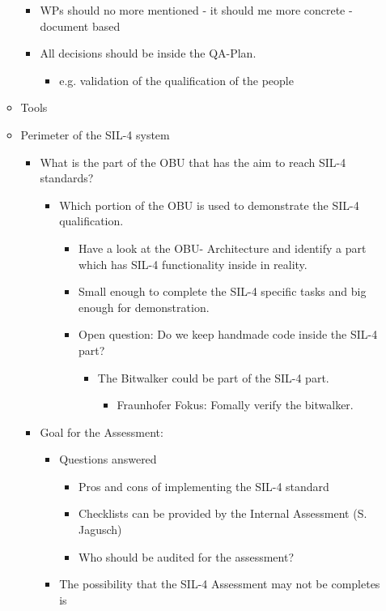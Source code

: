 \documentclass[a4paper,german]{article}
\begin{document}
\begin{enumerate}
\begin{itemize}
\begin{itemize}
\item WPs should no more mentioned - it should me more concrete - document based
\item All decisions should be inside the QA-Plan.
\begin{itemize}
\item e.g. validation of the qualification of the people
\end{itemize}
\end{itemize}
\item Tools
\item Perimeter of the SIL-4 system
\begin{itemize}
\item What is the part of the OBU that has the aim to reach SIL-4 standards?
\begin{itemize}
\item Which portion of the OBU is used to demonstrate the SIL-4 qualification.
\begin{itemize}
\item Have a look at the OBU- Architecture and identify a part which has SIL-4 functionality inside in reality.
\item Small enough to complete the SIL-4 specific tasks and big enough for demonstration.
\item Open question: Do we keep handmade code inside the SIL-4 part?
\begin{itemize}
\item The Bitwalker could be part of the SIL-4 part.
\begin{itemize}
\item Fraunhofer Fokus: Fomally verify the bitwalker.
\end{itemize}
\end{itemize}
\end{itemize}
\end{itemize}
\item Goal for the Assessment:
\begin{itemize}
\item Questions answered
\begin{itemize}
\item Pros and cons of implementing the SIL-4 standard
\item Checklists can be provided by the Internal Assessment (S. Jagusch)
\item Who should be audited for the assessment?
\end{itemize}
\item The possibility that the SIL-4 Assessment may not be completes is 

\end{itemize}
\end{itemize}
\end{itemize}
\end{enumerate}
\end{document}
